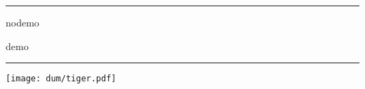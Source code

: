 \documentclass[a4paper,\myClassOptions]{article}
\begin{document}
\hrule
\begin{description}
  \Large
  \item[graphicx:] nodemo
  \item[pdfpages:] demo
\end{description}
\hrule

\tableofcontents
\texttt{[image: dum/tiger.pdf]}


\end{document}
